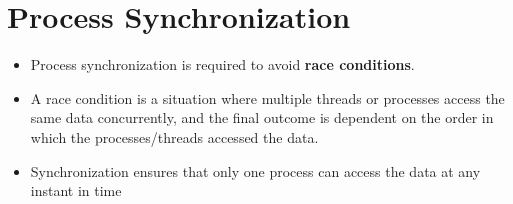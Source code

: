 \documentclass{article}
\theoremstyle{plain}
\theoremstyle{definition}
\begin{document}
\section{Process Synchronization}
\begin{itemize}
    \item Process synchronization is required to avoid \textbf{race conditions}.
    
    \item A race condition is a situation where multiple threads or processes access the same data concurrently, and the final outcome is dependent on the order in which the processes/threads accessed the data. 
    
    \item Synchronization ensures that only one process can access the data at any instant in time
\end{itemize}
\end{document}
